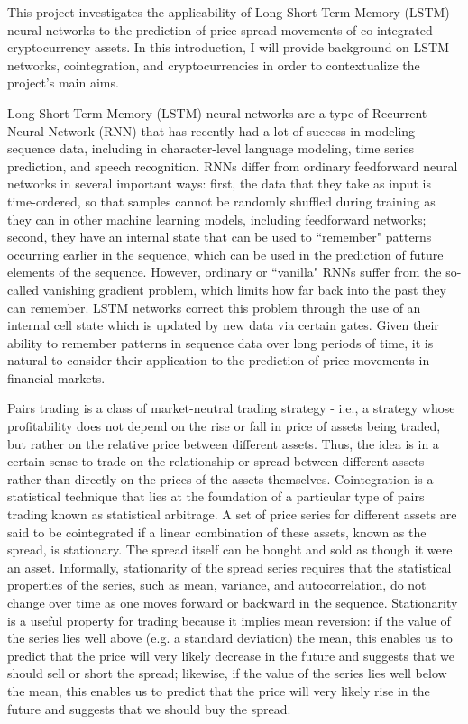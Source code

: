 \documentclass{article}
\begin{document}
This project investigates the applicability of Long Short-Term Memory (LSTM) neural networks to the prediction of price spread movements of co-integrated cryptocurrency assets. In this introduction, I will provide background on LSTM networks, cointegration, and cryptocurrencies in order to contextualize the project's main aims. 

Long Short-Term Memory (LSTM) neural networks are a type of Recurrent Neural Network (RNN) that has recently had a lot of success in modeling sequence data, including in character-level language modeling, time series prediction, and speech recognition. RNNs differ from ordinary feedforward neural networks in several important ways: first, the data that they take as input is time-ordered, so that samples cannot be randomly shuffled during training as they can in other machine learning models, including feedforward networks; second, they have an internal state that can be used to ``remember" patterns occurring earlier in the sequence, which can be used in the prediction of future elements of the sequence. However, ordinary or ``vanilla" RNNs suffer from the so-called vanishing gradient problem, which limits how far back into the past they can remember. LSTM networks correct this problem through the use of an internal cell state which is updated by new data via certain gates. Given their ability to remember patterns in sequence data over long periods of time, it is natural to consider their application to the prediction of price movements in financial markets. 

Pairs trading is a class of market-neutral trading strategy - i.e., a strategy whose profitability does not depend on the rise or fall in price of assets being traded, but rather on the relative price between different assets. Thus, the idea is in a certain sense to trade on the relationship or spread between different assets rather than directly on the prices of the assets themselves. Cointegration is a statistical technique that lies at the foundation of a particular type of pairs trading known as statistical arbitrage. A set of price series for different assets are said to be cointegrated if a linear combination of these assets, known as the spread, is stationary. The spread itself can be bought and sold as though it were an asset. Informally, stationarity of the spread series requires that the statistical properties of the series, such as mean, variance, and autocorrelation, do not change over time as one moves forward or backward in the sequence. Stationarity is a useful property for trading because it implies mean reversion: if the value of the series lies well above (e.g. a standard deviation) the mean, this enables us to predict that the price will very likely decrease in the future and suggests that we should sell or short the spread; likewise, if the value of the series lies well below the mean, this enables us to predict that the price will very likely rise in the future and suggests that we should buy the spread. 
\end{document}
